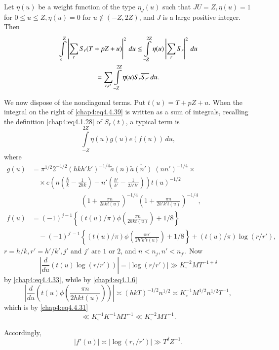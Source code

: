 Let $\eta(u)$ be a weight function of the type $\eta_J(u)$ such that
$JU=Z,\eta(u)=1$ for $0\leq u\leq Z,\eta(u)=0$ for $u\notin (-Z,2Z)$,
and $J$ is a large positive integer. Then 
\begin{gather}
\int\limits_\circ^Z\left|\sum\limits_r S_r(T+pZ+u)\right|^2\,du\leq \int\limits_{-Z}^{2Z}\eta(u)\left|\sum\limits_rS_r\right|^2 \,du\label{chap4:eq4.4.39}\\
=\sum\limits_{r,r'}\int\limits_{-Z}^{2Z}\eta(u)S_r\overline{S_{r'}}\,du.\notag
\end{gather}

We now dispose of the nondiagonal terms. Put $t(u)=T+pZ+u$. When the integral on the right of \eqref{chap4:eq4.4.39} is written as a sum of integrals, recalling the definition \eqref{chap4:eq4.1.28} of $S_r(t)$, a typical term is 
\begin{equation}\label{chap4:eq4.4.40}
\int\limits_{-Z}^{2Z}\eta(u)g(u)e(f(u))\,du,
\end{equation}
where\pageoriginale
\begin{align*}
g(u) &=
\pi^{1/2}2^{-1/2}(hkh'k')^{-1/4}\tilde{a}(n)\overline{\tilde{a}(n')}\;
(nn')^{-1/4}\times\\ 
&\quad \times
e\left(n\left(\frac{\bar{h}}{k}-\frac{1}{2hk}\right)-n'\left(
\frac{\overline{h'}}{k'}-\frac{1}{2h'k'}\right)\right)t(u)^{-1/2}\\
& \hspace{3cm}\left(1+
\frac{\pi n}{2hkt(u)}\right)^{-1/4}\left(1+\frac{\pi n}{2h'k't(u)}
\right)^{-1/4},\\ 
f(u) &= (-1)^{j-1}\left\{(t(u)/\pi)\phi\left(\frac{\pi n}{2hkt(u)}\right)+1/8 \right\}\\
&\quad -(-1)^{j'-1}\left\{(t(u)/\pi)\phi\left(\frac{\pi n'}{2h'k't(u)}\right)+ 1/8\right\}+(t(u)/\pi)\log(r/r'),
\end{align*}
$r=h/k,r'=h'/k',j'$ and $j'$ are $1$ or $2$, and $n<n_j,n'<n_{j'}$. Now 
$$
\left|\frac{d}{du}\left(t(u)\log\left(r/r'\right)\right)\right|=\left|\log \left(r/r'\right)\right|\gg K_\circ^{-2}MT^{-1+\delta}
$$
by \eqref{chap4:eq4.4.33}, while by \eqref{chap4:eq4.1.6}
$$
\left|\frac{d}{du}\left(t(u)\phi\left(\frac{\pi n}{2hkt(u)}\right)\right)\right|\asymp (hkT)^{-1/2}n^{1/2}\asymp K_\circ^{-1} M^{1/2} n^{1/2} T^{-1},
$$
which is by \eqref{chap4:eq4.4.31}
$$
\ll K_\circ^{-1}K^{-1}MT^{-1}\ll K_\circ^{-2}MT^{-1}.
$$

Accordingly,
$$
|f'(u)|\asymp |\log(r,/r')|\gg T^\delta Z^{-1}.
$$

